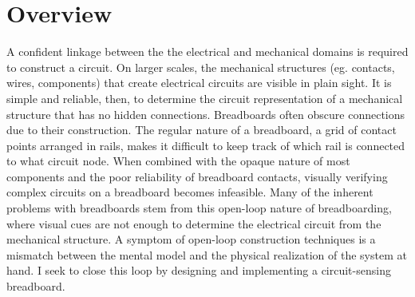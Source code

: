 \documentclass[11pt, a4paper]{article}
\begin{document}
\section{Overview}

A confident linkage between the the electrical and mechanical domains is required to construct a circuit.
On larger scales, the mechanical structures (eg. contacts, wires, components) that create electrical circuits are visible in plain sight.
It is simple and reliable, then, to determine the circuit representation of a mechanical structure that has no hidden connections.
Breadboards often obscure connections due to their construction.
The regular nature of a breadboard, a grid of contact points arranged in rails, makes it difficult to keep track of which rail is connected to what circuit node.
When combined with the opaque nature of most components and the poor reliability of breadboard contacts, visually verifying complex circuits on a breadboard becomes infeasible.
Many of the inherent problems with breadboards stem from this open-loop nature of breadboarding, where visual cues are not enough to determine the electrical circuit from the mechanical structure.
A symptom of open-loop construction techniques is a mismatch between the mental model and the physical realization of the system at hand.
I seek to close this loop by designing and implementing a circuit-sensing breadboard.




\end{document}
